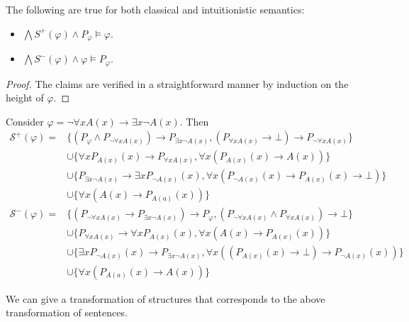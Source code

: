 \documentclass[a4paper,UKenglish,cleveref, autoref, thm-restate]{lipics-v2021}
\begin{document}
\begin{lemma}The following are true for both classical and intuitionistic semantics:
	\begin{itemize}
		\item $\bigwedge S^+(\varphi)\wedge P_\varphi\models\varphi$.
		\item $\bigwedge S^-(\varphi)\wedge \varphi\models P_\varphi$.
	\end{itemize}
\end{lemma}

\begin{proof}
	The claims are verified in a straightforward manner by induction on the height of $\varphi$.
\end{proof}

\begin{example}
	Consider $\varphi = \neg\forall x A(x)\to \exists x\neg A(x)$. Then
	\begin{align*}
		\mathcal S^+(\varphi) = &\{(P_\varphi\wedge P_{\neg\forall x A(x)})\to P_{\exists x\neg A(x)}, (P_{\forall xA(x)}\to\bot)\to P_{\neg \forall xA(x)}\}\\&\cup\{\forall xP_{A(x)}(x)\to P_{\forall xA(x)}, \forall x(P_{A(x)}(x)\to A(x))\}\\&\cup\{P_{\exists x\neg A(x)}\to \exists xP_{\neg A(x)}(x), \forall x(P_{\neg A(x)}(x)\to P_{A(x)}(x)\to \bot)\}\\&\cup\{\forall x(A(x)\to P_{A(a)}(x))\}\\
		\mathcal S^-(\varphi) = &\{(P_{\neg\forall x A(x)}\to P_{\exists x\neg A(x)})\to P_\varphi,  (P_{\neg \forall xA(x)}\wedge P_{\forall xA(x)})\to\bot\}\\&\cup\{P_{\forall xA(x)}\to \forall xP_{A(x)}(x), \forall x(A(x)\to P_{A(x)}(x))\}\\&\cup\{\exists xP_{\neg A(x)}(x)\to P_{\exists x\neg A(x)}, \forall x((P_{A(x)}(x)\to \bot)\to P_{\neg A(x)}(x))\}\\&\cup\{\forall x(P_{A(a)}(x)\to A(x))\}
	\end{align*}
\end{example}

We can give a transformation of structures that corresponds to the above transformation of sentences.	
\end{document}
